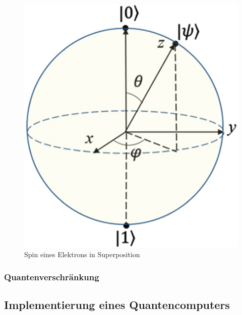 \begin{figure}[!hbt]
    \centering
    \includegraphics{./images/spin-superpostition.jpg}
    \caption{Spin eines Elektrons in Superposition \cite{noauthor_cpb_27_9_090308_f8jpg_nodate}}
    \label{fig:spin}
\end{figure}

\subsubsection{Quantenverschränkung}



\subsection{Implementierung eines Quantencomputers}


